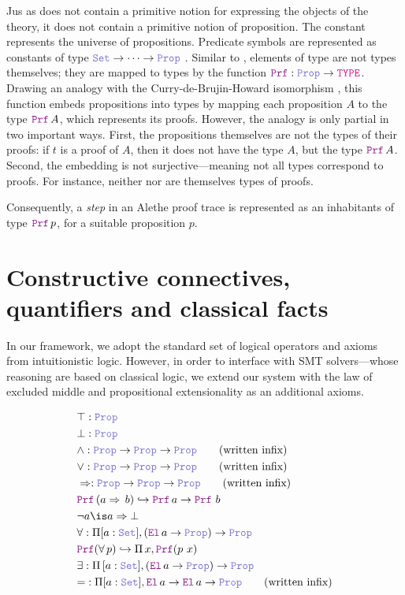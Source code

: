 Jus as \lpm{} does not contain a primitive notion for expressing the objects of the theory, it does not contain a primitive notion of proposition.
The constant \prop{} represents the universe of propositions. Predicate symbols are represented as constants of type $\set{} \ra \dots \ra \prop$ .
Similar to \set{}, elements of type \prop{} are not types themselves; they are mapped to types by the function $\prf{}: \prop \rightarrow \type$.
Drawing an analogy with the Curry-de-Brujin-Howard isomorphism \cite{curryhoward}, this function embeds propositions into types by mapping each proposition $A$ to the type $\prf\,A$, which represents its proofs.
However, the analogy is only partial in two important ways. First, the propositions themselves are not the types of their proofs: if $t$ is a proof of $A$, then it does not have the type $A$,
but the type $\prf\,A$. Second, the embedding is not surjective—meaning not all types correspond to proofs. For instance, neither \set{} nor \prop{} are themselves types of proofs.

Consequently, a \emph{step} in an Alethe proof trace is represented as an inhabitants of type $\prf{}\,p$, for a suitable proposition $p$.

\section{Constructive connectives, quantifiers and classical facts}
\label{ssec:encoding-prop}

In our framework, we adopt the standard set of logical operators and axioms from intuitionistic logic.
However, in order to interface with SMT solvers—whose reasoning are based on classical logic, we extend our system with the law of excluded middle and propositional extensionality as an additional axioms.

\begin{definition}
\begin{align}
& \top : \prop \\
& \bot : \prop \\
& \land : \prop \ra \prop \ra \prop \qquad \text{(written inﬁx)} \\
& \lor : \prop \ra \prop \ra \prop \qquad \text{(written inﬁx)} \\
& \Rightarrow : \prop \ra \prop \ra \prop \qquad \text{(written inﬁx)} \\
&  \prf\,(a \Rightarrow\,b) \re \prf\, a \ra \prf\,\,b \label{eq:imp}\\
& \neg a \is a \Rightarrow \bot \\
& \forall : \Pi {[a: \set]}, (\el\, a \ra \prop) \ra \prop \label{eq:forall}\\
& \prf{}(\forall\,p) \re \Pi\, x, \prf{(p~x)}\\
& \exists : \Pi\, {[a: \set]}, (\el\, a \ra \prop) \ra \prop \\
& {=} : \Pi [a : \set], \el\, a \ra \el\, a \ra \prop \qquad \text{(written inﬁx)}
\end{align}
\end{definition}

